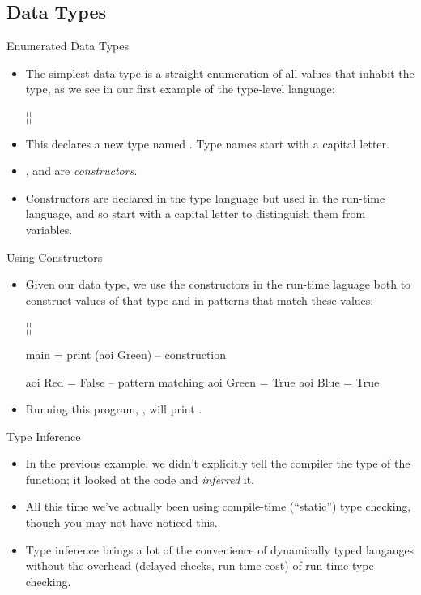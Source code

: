 \documentclass[xcolor=dvipsnames]{beamer}          %
\newcommand{\lH}[1]{\color{MidnightBlue}{#1}}
\newcommand{\lT}[1]{\color{Fuchsia}{#1}}        %
\begin{document}
\subsection{Data Types}

\begin{frame}[fragile]{Enumerated Data Types}
\begin{itemize}
    \item The simplest data type is a straight enumeration of all values
        that inhabit the type, as we see in our first example of the
        type-level language:
        \begin{hlisting}
            ¦\lT{data Color = Red | Green | Blue}¦
        \end{hlisting}
    \item This declares a new type named . Type names start
        with a capital letter.
    \item {},  and  are \emph{constructors}.
    \item Constructors are declared in the type language but used in
        the run-time language, and so start with a capital letter to
        distinguish them from variables.
\end{itemize}
\end{frame}


\begin{frame}[fragile]{Using Constructors}
\begin{itemize}
    \item Given our data type, we use the constructors in the run-time
        laguage both to construct values of that type and in patterns
        that match these values:
        \begin{hlisting}
            ¦\lT{data Color = Red | Green | Blue}¦

            main = print (aoi Green)    -- construction

            aoi Red   = False           -- pattern matching
            aoi Green = True
            aoi Blue  = True
        \end{hlisting}
    \item Running this program, , will print .
\end{itemize}
\end{frame}


\begin{frame}[fragile]{Type Inference}
\begin{itemize}
    \item In the previous example, we didn't explicitly tell the compiler
        the type of the \T{\lH{aoi}} function; it looked at the code
        and \emph{inferred} it.
    \item All this time we've actually been using compile-time
        (``static'') type checking, though you may not have noticed this.
    \item Type inference brings a lot of the convenience of dynamically
        typed langauges without the overhead (delayed checks, run-time
        cost) of run-time type checking.
\end{itemize}
\end{frame}
\end{document}
